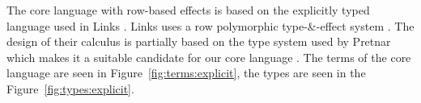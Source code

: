 The core language with row-based effects is based on the explicitly typed language used in Links \cite{row}. Links uses a row polymorphic type-\&-effect system . The design of their calculus is partially based on the type system used by Pretnar which makes it a suitable candidate for our core language \cite{pretnar2015introduction}. The terms of the core language are seen in Figure~\ref{fig:terms:explicit}, the types are seen in the Figure~\ref{fig:types:explicit}.
